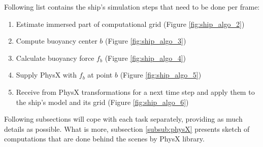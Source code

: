 \documentclass{report}
\begin{document}
Following list contains the ship's simulation steps that need to be done per frame:
\begin{enumerate}
\item Estimate immersed part of computational grid (Figure \ref{fig:ship_algo_2})
\item Compute buoyancy center $b$ (Figure \ref{fig:ship_algo_3})
\item Calculate buoyancy force $f_b$ (Figure \ref{fig:ship_algo_4})
\item Supply PhysX with $f_b$ at point $b$ (Figure \ref{fig:ship_algo_5})
\item Receive from PhysX transformations for a next time step and apply them to the ship's model and its grid (Figure \ref{fig:ship_algo_6})
\end{enumerate}
Following subsections will cope with each task separately, providing as much details as possible. What is more, subsection \ref{subsub:physX} presents sketch of computations that are done behind the scenes by PhysX library.
\end{document}
